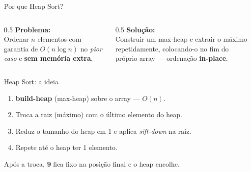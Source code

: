 \documentclass[aspectratio=169]{beamer}
\begin{document}
\begin{frame}{Por que Heap Sort?}
  \begin{columns}[T]
    \begin{column}{0.5\textwidth}
      \textbf{Problema:}\\[0.3em]
      Ordenar $n$ elementos com garantia de $O(n\log n)$ no \emph{pior caso} e
      \textbf{sem memória extra}.
    \end{column}
    \begin{column}{0.5\textwidth}
      \textbf{Solução:}\\[0.3em]
      Construir um max-heap e extrair o máximo repetidamente, colocando-o no fim
      do próprio array — ordenação \textbf{in-place}.
    \end{column}
  \end{columns}
\end{frame}

\begin{frame}{Heap Sort: a ideia}
  \begin{enumerate}
    \item \textbf{build-heap} (max-heap) sobre o array — $O(n)$.
    \item Troca a raiz (máximo) com o último elemento do heap.
    \item Reduz o tamanho do heap em 1 e aplica \emph{sift-down} na raiz.
    \item Repete até o heap ter 1 elemento.
  \end{enumerate}
  \begin{center}
  \end{center}
  Após a troca, \textbf{9} fica fixo na posição final e o heap encolhe.
\end{frame}
\end{document}
